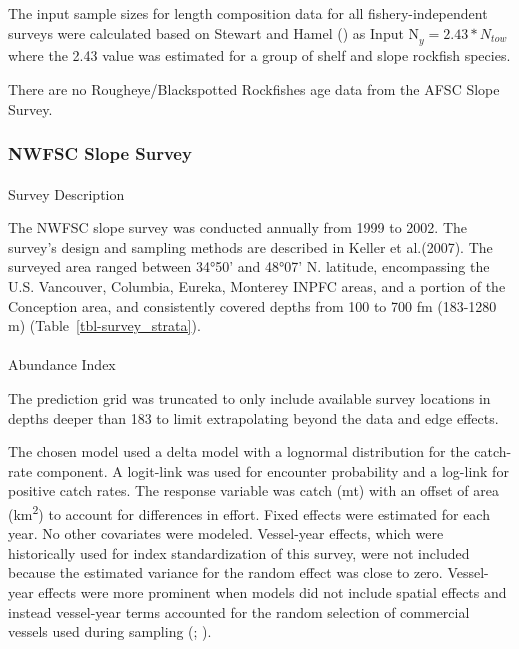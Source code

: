 \documentclass[
]{scrartcl}
\makeatletter
\let\oldparagraph\paragraph
\renewcommand{\paragraph}{
    \@ifstar
      \xxxParagraphStar
      \xxxParagraphNoStar
  }
\newcommand{\xxxParagraphStar}[1]{\oldparagraph*{#1}\mbox{}}
\newcommand{\xxxParagraphNoStar}[1]{\oldparagraph{#1}\mbox{}}
\makeatother
\begin{document}
The input sample sizes for length composition data for all
fishery-independent surveys were calculated based on Stewart and Hamel
() as
\(\text{Input N}_{y} = 2.43*N_{tow}\) where the 2.43 value was estimated
for a group of shelf and slope rockfish species.

There are no Rougheye/Blackspotted Rockfishes age data from the AFSC
Slope Survey.

\subsubsection{NWFSC Slope Survey}\label{nwfsc-slope-survey}

\paragraph{Survey Description}\label{survey-description-3}

The NWFSC slope survey was conducted annually from 1999 to 2002. The
survey's design and sampling methods are described in Keller et
al.(2007). The surveyed area ranged between 34°50' and 48°07' N.
latitude, encompassing the U.S. Vancouver, Columbia, Eureka, Monterey
INPFC areas, and a portion of the Conception area, and consistently
covered depths from 100 to 700 fm (183-1280 m)
(Table~\ref{tbl-survey_strata}).

\paragraph{Abundance Index}\label{abundance-index-3}

The prediction grid was truncated to only include available survey
locations in depths deeper than 183 to limit extrapolating beyond the
data and edge effects.

The chosen model used a delta model with a lognormal distribution for
the catch-rate component. A logit-link was used for encounter
probability and a log-link for positive catch rates. The response
variable was catch (mt) with an offset of area (km\textsuperscript{2})
to account for differences in effort. Fixed effects were estimated for
each year. No other covariates were modeled. Vessel-year effects, which
were historically used for index standardization of this survey, were
not included because the estimated variance for the random effect was
close to zero. Vessel-year effects were more prominent when models did
not include spatial effects and instead vessel-year terms accounted for
the random selection of commercial vessels used during sampling
(;
).
\end{document}
